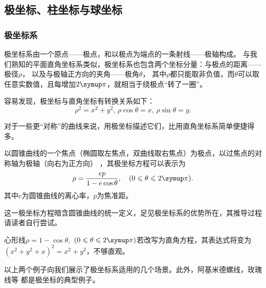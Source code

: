 \subsection{极坐标、柱坐标与球坐标}
\subsubsection{极坐标系}
极坐标系由一个原点——极点，和以极点为端点的一条射线——极轴构成。
与我们熟知的平面直角坐标系类似，极坐标系也包含两个坐标分量：与极点的距离——极径$\rho $，
以及与极轴正方向的夹角——极角$\theta $，
其中$\rho $都只能取非负值，而$\theta $可以取任意实数值，且每增加$2\symup\pi$，就相当于绕极点“转了一圈”。


容易发现，极坐标与直角坐标有转换关系如下：
\[
    \rho ^2=x^2+y^2,\,\rho \cos \theta=x,\,\rho \sin \theta=y
    .\]


对于一些更“对称”的曲线来说，用极坐标描述它们，比用直角坐标系简单便捷得多。
\begin{example}
    以圆锥曲线的一个焦点（椭圆取左焦点，双曲线取右焦点）为极点，以过焦点的对称轴为极轴（向右为正方向）
    ，其极坐标方程可以表示为
    \[
        \rho =\frac{ep}{1-e\cos \theta},\quad(0\leqslant \theta \leqslant 2 \symup\pi)
        .\]
    其中$e$为圆锥曲线的离心率，$p$为焦准距。
\end{example}


这一极坐标方程暗含圆锥曲线的统一定义，足见极坐标系的优势所在，其推导过程请读者自行尝试。%
\begin{example}
    心形线$\rho =1-\cos \theta$,~$ (0\leqslant \theta \leqslant 2 \symup\pi)$若改写为直角方程，其表达式将变为
    $(x^2+y^2+x)^2=x^2+y^2$，不够直观。
\end{example}

\begin{center}
\end{center}

以上两个例子向我们展示了极坐标系适用的几个场景。此外，阿基米德螺线，玫瑰线等
都是极坐标的典型例子。

